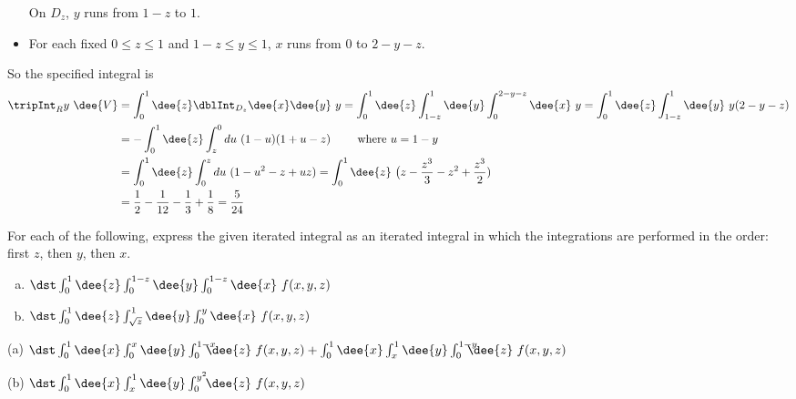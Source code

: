 \begin{solution}
\begin{itemize}
On $D_z$, $y$ runs from $1-z$ to $1$.
\item
For each fixed $0\le z\le 1$ and $1-z\le y\le 1$, $x$ runs from $0$
to $2-y-z$. 
\end{itemize}
So the specified integral is
\begin{align*}
\tripInt_R y\ \dee{V}
&=\int_0^1\dee{z}\dblInt_{D_z} \dee{x}\dee{y}\ y
=\int_0^1 \dee{z}\int_{1-z}^1 \dee{y}\int_0^{2-y-z} \dee{x}\ y
=\int_0^1 \dee{z}\int_{1-z}^1 \dee{y}\ y(2-y-z)\cr
&=-\int_0^1 \dee{z}\int_z^0 du\ (1-u)(1+u-z)\qquad\text{ where $u=1-y$}\\
&=\int_0^1 \dee{z}\int_0^z du\ (1-u^2-z+uz)
=\int_0^1 \dee{z}\ \big(z-\frac{z^3}{3}-z^2+\frac{z^3}{2})\\
&=\frac{1}{2}-\frac{1}{12}-\frac{1}{3}+\frac{1}{8}
=\frac{5}{24}
\end{align*}
\end{solution}

\begin{question}
For each of the following, express the given iterated integral as an
iterated integral in which the integrations are  performed in the order:
first $z$, then $y$, then $x$.
\begin{enumerate}[(a)]
\item
$\dst\int_0^1\dee{z}\int_0^{1-z}\dee{y}\int_0^{1-z} \dee{x}\ f(x,y,z)$
\item
$\dst\int_0^1\dee{z}\int_{\sqrt z}^1\dee{y}\int_0^y \dee{x}\ f(x,y,z)$
\end{enumerate}
\end{question}

%

\begin{answer}
(a) $\dst\int_0^1\dee{x}\int_0^{x}\dee{y}\int_0^{1-x}\hskip-10pt \dee{z}\hskip3pt f(x,y,z)
+\int_0^1\dee{x}\int_x^{1}\dee{y}\int_0^{1-y}\hskip-10pt \dee{z}\hskip3pt f(x,y,z)$

(b) $\dst\int_0^1\dee{x}\int_x^{1}\dee{y}\int_0^{y^2}\!\! \dee{z}\  f(x,y,z)$
\end{answer}

